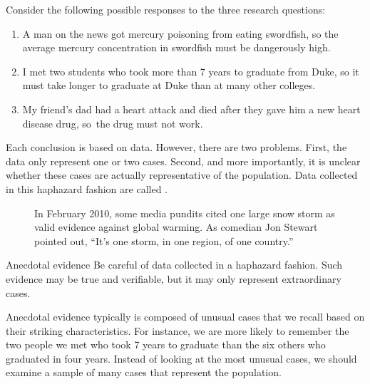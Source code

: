 
\noindent%
Consider the following possible responses to the three research questions:
\begin{enumerate}
\setlength{\itemsep}{0mm}
\item
    A man on the news got mercury poisoning from eating swordfish,
    so the average mercury concentration in swordfish must be
    dangerously high.
\item\label{iKnowThreeStudentsWhoTookMoreThan7YearsToGraduateAtDuke}
    I met two students who took more than 7 years to graduate
    from Duke, so it must take longer to graduate at Duke than
    at many other colleges.
\item\label{myFriendsDadDiedAfterSulphinpyrazon}
    My friend's dad had a heart attack and died after they gave
    him a new heart disease drug, so~the drug must not work.
\end{enumerate}
Each conclusion is based on data.
However, there are two problems.
First, the data only represent one or two cases.
Second, and more importantly, it is unclear whether these cases
are actually representative of the population.
Data collected in this haphazard fashion are called
.

\setlength{\captionwidth}{\textwidth-75mm}
\begin{figure}[h]
  \centering
  \hspace{8mm}\hspace{4mm}
  \begin{minipage}[b]{\textwidth-75mm}
    \caption[anecdotal evidence]{In February 2010,
        some media pundits cited one large snow storm
        as valid evidence against global warming.
        As comedian Jon Stewart pointed out,
        ``It's one storm, in one region, of one country.''
    \label{mnWinter}}
  \end{minipage}
\end{figure}
\setlength{\captionwidth}{\mycaptionwidth}

\begin{onebox}{Anecdotal evidence}
Be careful of data collected in a haphazard fashion.
Such evidence may be true and verifiable, but it may
only represent extraordinary cases.
\end{onebox}

Anecdotal evidence typically is composed of unusual cases that we recall based on their striking characteristics. For instance, we are more likely to remember the two people we met who took 7 years to graduate than the six others who graduated in four years. Instead of looking at the most unusual cases, we should examine a sample of many cases that represent the population.


